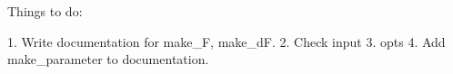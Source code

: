Things to do:

1. Write documentation for make_F, make_dF.
2. Check input
3. opts
4. Add make_parameter to documentation.

